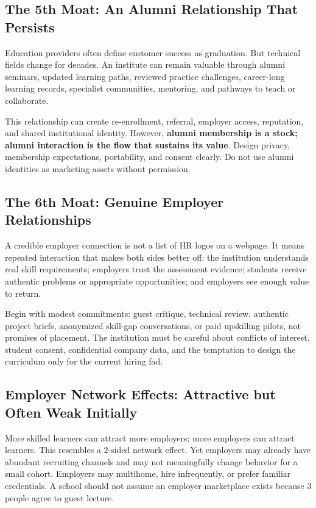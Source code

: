 \subsection{The 5th Moat: An Alumni Relationship That Persists}
\label{sec:fifth_moat_persisting_alumni_relationship}

Education providers often define customer success as graduation. But technical fields change for decades. An institute can remain valuable through alumni seminars, updated learning paths, reviewed practice challenges, career-long learning records, specialist communities, mentoring, and pathways to teach or collaborate.

This relationship can create re-enrollment, referral, employer access, reputation, and shared institutional identity. However, \textbf{alumni membership is a stock; alumni interaction is the flow that sustains its value}. Design privacy, membership expectations, portability, and consent clearly. Do not use alumni identities as marketing assets without permission.

\subsection{The 6th Moat: Genuine Employer Relationships}
\label{sec:sixth_moat_genuine_employer_relationships}

A credible employer connection is not a list of HR logos on a webpage. It means repeated interaction that makes both sides better off: the institution understands real skill requirements; employers trust the assessment evidence; students receive authentic problems or appropriate opportunities; and employers see enough value to return.

Begin with modest commitments: guest critique, technical review, authentic project briefs, anonymized skill-gap conversations, or paid upskilling pilots, not promises of placement. The institution must be careful about conflicts of interest, student consent, confidential company data, and the temptation to design the curriculum only for the current hiring fad.

\subsection{Employer Network Effects: Attractive but Often Weak Initially}
\label{sec:employer_network_effects_weak_initially}

More skilled learners can attract more employers; more employers can attract learners. This resembles a 2-sided network effect. Yet employers may already have abundant recruiting channels and may not meaningfully change behavior for a small cohort. Employers may multihome, hire infrequently, or prefer familiar credentials. A school should not assume an employer marketplace exists because 3 people agree to guest lecture.

